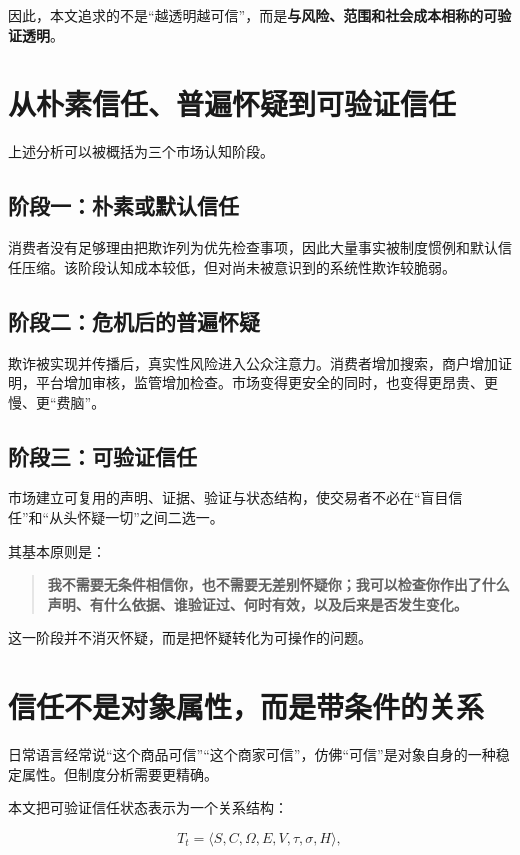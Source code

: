 \documentclass[UTF8,12pt]{ctexart}
\begin{document}
因此，本文追求的不是“越透明越可信”，而是\textbf{与风险、范围和社会成本相称的可验证透明}。

\section{从朴素信任、普遍怀疑到可验证信任}

上述分析可以被概括为三个市场认知阶段。

\subsection{阶段一：朴素或默认信任}

消费者没有足够理由把欺诈列为优先检查事项，因此大量事实被制度惯例和默认信任压缩。该阶段认知成本较低，但对尚未被意识到的系统性欺诈较脆弱。

\subsection{阶段二：危机后的普遍怀疑}

欺诈被实现并传播后，真实性风险进入公众注意力。消费者增加搜索，商户增加证明，平台增加审核，监管增加检查。市场变得更安全的同时，也变得更昂贵、更慢、更“费脑”。

\subsection{阶段三：可验证信任}

市场建立可复用的声明、证据、验证与状态结构，使交易者不必在“盲目信任”和“从头怀疑一切”之间二选一。

其基本原则是：

\begin{quote}
\textbf{我不需要无条件相信你，也不需要无差别怀疑你；我可以检查你作出了什么声明、有什么依据、谁验证过、何时有效，以及后来是否发生变化。}
\end{quote}

这一阶段并不消灭怀疑，而是把怀疑转化为可操作的问题。

\section{信任不是对象属性，而是带条件的关系}

日常语言经常说“这个商品可信”“这个商家可信”，仿佛“可信”是对象自身的一种稳定属性。但制度分析需要更精确。

本文把可验证信任状态表示为一个关系结构：

\[
T_t=\langle S,C,\Omega,E,V,\tau,\sigma,H\rangle,
\]
\end{document}

